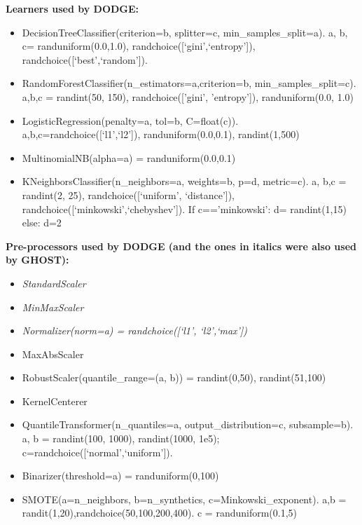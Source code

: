 \documentclass[10pt,compsoc,twocolumn]{IEEEtran}
\newcommand{\bi}{\begin{itemize}}
\newcommand{\ei}{\end{itemize}}
\begin{document}
\begin{table}[!t]

\scriptsize
 
 \begin{tcolorbox}[colback=white]
 \begin{flushleft}
\textbf{Learners used by DODGE:}  

\noindent
\begin{itemize}
\item DecisionTreeClassifier(criterion=b, splitter=c, min\_samples\_split=a).
    a, b, c= randuniform(0.0,1.0), randchoice([`gini',`entropy']),   randchoice([`best',`random']).
  
\item RandomForestClassifier(n\_estimators=a,criterion=b,  min\_samples\_split=c).  a,b,c = randint(50, 150), randchoice(['gini', 'entropy']),  randuniform(0.0, 1.0) 
 
\item LogisticRegression(penalty=a, tol=b, C=float(c)).
       a,b,c=randchoice([`l1',`l2']), randuniform(0.0,0.1), randint(1,500)
     
\item MultinomialNB(alpha=a) = randuniform(0.0,0.1)
\item KNeighborsClassifier(n\_neighbors=a, weights=b, p=d, metric=c).  a, b,c  = randint(2, 25), randchoice([`uniform', `distance']),  randchoice([`minkowski',`chebyshev']). 
  If c=='minkowski': d= randint(1,15)  else:  d=2

\end{itemize}


{\bf Pre-processors used by DODGE (and the ones in italics were also used  by GHOST):} 

\bi 
\item \textit{StandardScaler}
\item \textit{MinMaxScaler}
\item \textit{Normalizer(norm=a) = randchoice([`l1', `l2',`max'])}
 \item MaxAbsScaler
 \item RobustScaler(quantile\_range=(a, b)) =  randint(0,50), randint(51,100) 
 \item KernelCenterer
 \item QuantileTransformer(n\_quantiles=a,  output\_distribution=c, subsample=b). a, b = randint(100, 1000), randint(1000, 1e5);
   c=randchoice([`normal',`uniform']).
\item Binarizer(threshold=a) =  randuniform(0,100)
   
    \item SMOTE(a=n\_neighbors, b=n\_synthetics,  c=Minkowski\_exponent). a,b = randit(1,20),randchoice(50,100,200,400). c = randuniform(0.1,5)
     
\ei
\end{flushleft}
\end{tcolorbox}
\caption{Hyperparameter  options explored by DODGE \cite{agrawal2019dodge}.  GHOST optimizers uses some of these parameters (see the pre-processing options shown in {\em italics}) in the manner discussed in Table~\ref{tab:preprocessors2}.}\label{tab:preprocessors1}
\end{table}
\end{document}
